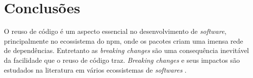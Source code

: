 \chapter{Conclusões}
\label{cap:conclusoes}

O reuso de código é um aspecto essencial no desenvolvimento de \textit{software}, principalmente no ecossistema do \textsf{npm}, onde os pacotes criam uma imensa rede de dependências. Entretanto as \textit{breaking changes} são uma consequência inevitável da facilidade que o reuso de código traz. \textit{Breaking changes} e seus impactos são estudados na literatura em vários ecossistemas de \textit{softwares} .

